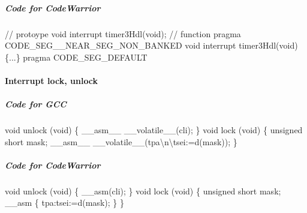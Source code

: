 \documentclass[a4paper,12pt]{book}
\begin{document}
\subparagraph{Code for CodeWarrior}
{\ttfamily
 // protoype\newline
 void interrupt timer3Hdl(void);\newline
 // function\newline
 pragma CODE\_SEG\_\_NEAR\_SEG\_NON\_BANKED\newline
 void interrupt timer3Hdl(void)\newline
 \{...\}\newline
 pragma CODE\_SEG\_DEFAULT}

\paragraph{Interrupt lock, unlock}
\subparagraph{Code for GCC}
{\ttfamily
 void unlock (void)\newline
 \{\newline
  \space \_\_asm\_\_
\_\_volatile\_\_({\textquotedbl}cli{\textquotedbl});\newline
 \}\newline
 void lock (void)\newline
 \{\newline
  \space unsigned short mask;\newline
  \space \_\_asm\_\_
\_\_volatile\_\_({\textquotedbl}tpa{\textbackslash}n{\textbackslash}tsei{\textquotedbl}:{\textquotedbl}=d{\textquotedbl}(mask));\newline
 \}}

\subparagraph{Code for CodeWarrior}
{\ttfamily
void unlock (void)\newline
 \{\newline
  \space \_\_asm({\textquotedbl}cli{\textquotedbl});\newline
 \}\newline
 void lock (void)\newline
 \{\newline
  \space unsigned short mask;\newline
  \space \_\_asm\newline
  \{\newline
  \space tpa:tsei:{\textquotedbl}=d{\textquotedbl}(mask);\newline
  \}\newline
 \}}
\end{document}

